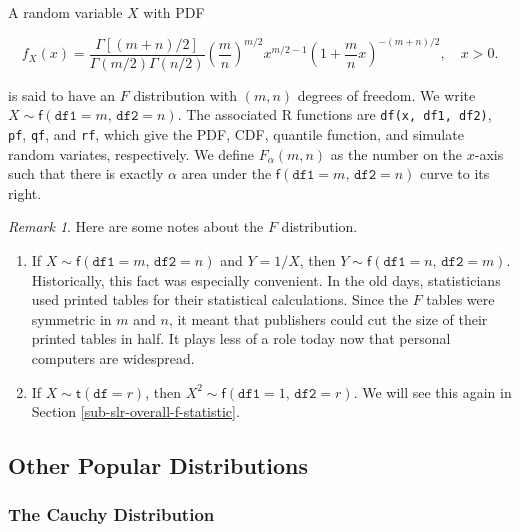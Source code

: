 \documentclass[]{book}
\providecommand{\tightlist}{%
  \setlength{\itemsep}{0pt}\setlength{\parskip}{0pt}}
\numberwithin{equation}{chapter}
\numberwithin{figure}{chapter}
\theoremstyle{plain}
\theoremstyle{definition}
\theoremstyle{remark}
\theoremstyle{definition}
\theoremstyle{definition}
\theoremstyle{remark}
\newtheorem*{remark}{Remark}
\begin{document}
A random variable \(X\) with PDF

\begin{equation}
f_{X}(x)=\frac{\Gamma[(m+n)/2]}{\Gamma(m/2)\Gamma(n/2)}\left(\frac{m}{n}\right)^{m/2}x^{m/2-1}\left(1+\frac{m}{n}x\right)^{-(m+n)/2},\quad x>0.
\end{equation}

is said to have an \(F\) distribution with \((m,n)\) degrees of freedom.
We write \(X\sim\mathsf{f}(\mathtt{df1}=m,\,\mathtt{df2}=n)\). The
associated R functions are \texttt{df(x,\ df1,\ df2)}, \texttt{pf},
\texttt{qf}, and \texttt{rf}, which give the PDF, CDF, quantile
function, and simulate random variates, respectively. We define
\(F_{\alpha}(m,n)\) as the number on the \(x\)-axis such that there is
exactly \(\alpha\) area under the
\(\mathsf{f}(\mathtt{df1}=m,\,\mathtt{df2}=n)\) curve to its right.

\bigskip

\begin{remark}
Here are some notes about the \(F\) distribution.

\begin{enumerate}
\def\labelenumi{\arabic{enumi}.}
\tightlist
\item
  If \(X\sim\mathsf{f}(\mathtt{df1}=m,\,\mathtt{df2}=n)\) and \(Y=1/X\),
  then \(Y\sim\mathsf{f}(\mathtt{df1}=n,\,\mathtt{df2}=m)\).
  Historically, this fact was especially convenient. In the old days,
  statisticians used printed tables for their statistical calculations.
  Since the \(F\) tables were symmetric in \(m\) and \(n\), it meant
  that publishers could cut the size of their printed tables in half. It
  plays less of a role today now that personal computers are widespread.
\item
  If \(X\sim\mathsf{t}(\mathtt{df}=r)\), then
  \(X^{2}\sim\mathsf{f}(\mathtt{df1}=1,\,\mathtt{df2}=r)\). We will see
  this again in Section \ref{sub-slr-overall-f-statistic}.
\end{enumerate}
\end{remark}

\subsection{Other Popular
Distributions}\label{sub-other-popular-distributions}

\subsubsection{The Cauchy
Distribution}\label{sub-the-cauchy-distribution}
\end{document}
